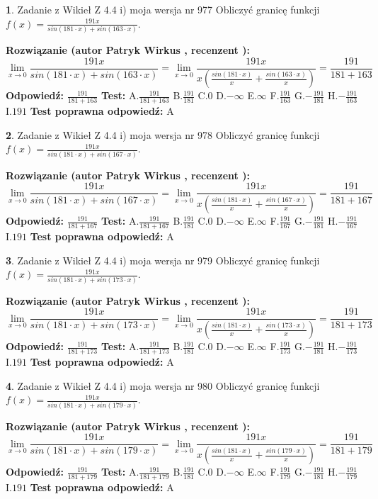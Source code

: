 \documentclass[12pt, a4paper]{article}
\theoremstyle{definition} %
\newtheorem{zad}{}
\newcommand{\zadStart}[1]{\begin{zad}#1\newline}
\newcommand{\zadStop}{\end{zad}}
\newcommand{\rozwStart}[2]{\noindent \textbf{Rozwiązanie (autor #1 , recenzent #2): }\newline}
\newcommand{\rozwStop}{\newline}
\newcommand{\odpStart}{\noindent \textbf{Odpowiedź:}\newline}
\newcommand{\odpStop}{\newline}
\newcommand{\testStart}{\noindent \textbf{Test:}\newline}
\newcommand{\testStop}{\newline}
\newcommand{\kluczStart}{\noindent \textbf{Test poprawna odpowiedź:}\newline}
\newcommand{\kluczStop}{\newline}
\begin{document}
\zadStart{Zadanie z Wikieł Z 4.4 i) moja wersja nr 977}
Obliczyć granicę funkcji $f(x)=\frac{191x}{sin(181\cdot x) +sin(163\cdot x)}$.
\zadStop
\rozwStart{Patryk Wirkus}{}
$$\lim\limits_{x\to 0}\frac{191x}{sin(181\cdot x) +sin(163\cdot x)}=\lim\limits_{x\to 0}\frac{191x}{x(\frac{sin(181\cdot x)}{x}+\frac{sin(163\cdot x)}{x})}=\frac{191}{181+163}$$
\rozwStop
\odpStart
$\frac{191}{181+163}$
\odpStop
\testStart
A.$\frac{191}{181+163}$
B.$\frac{191}{181}$
C.$0$
D.$-\infty$
E.$\infty$
F.$\frac{191}{163}$
G.$-\frac{191}{181}$
H.$-\frac{191}{163}$
I.$191$
\testStop
\kluczStart
A
\kluczStop



\zadStart{Zadanie z Wikieł Z 4.4 i) moja wersja nr 978}
Obliczyć granicę funkcji $f(x)=\frac{191x}{sin(181\cdot x) +sin(167\cdot x)}$.
\zadStop
\rozwStart{Patryk Wirkus}{}
$$\lim\limits_{x\to 0}\frac{191x}{sin(181\cdot x) +sin(167\cdot x)}=\lim\limits_{x\to 0}\frac{191x}{x(\frac{sin(181\cdot x)}{x}+\frac{sin(167\cdot x)}{x})}=\frac{191}{181+167}$$
\rozwStop
\odpStart
$\frac{191}{181+167}$
\odpStop
\testStart
A.$\frac{191}{181+167}$
B.$\frac{191}{181}$
C.$0$
D.$-\infty$
E.$\infty$
F.$\frac{191}{167}$
G.$-\frac{191}{181}$
H.$-\frac{191}{167}$
I.$191$
\testStop
\kluczStart
A
\kluczStop



\zadStart{Zadanie z Wikieł Z 4.4 i) moja wersja nr 979}
Obliczyć granicę funkcji $f(x)=\frac{191x}{sin(181\cdot x) +sin(173\cdot x)}$.
\zadStop
\rozwStart{Patryk Wirkus}{}
$$\lim\limits_{x\to 0}\frac{191x}{sin(181\cdot x) +sin(173\cdot x)}=\lim\limits_{x\to 0}\frac{191x}{x(\frac{sin(181\cdot x)}{x}+\frac{sin(173\cdot x)}{x})}=\frac{191}{181+173}$$
\rozwStop
\odpStart
$\frac{191}{181+173}$
\odpStop
\testStart
A.$\frac{191}{181+173}$
B.$\frac{191}{181}$
C.$0$
D.$-\infty$
E.$\infty$
F.$\frac{191}{173}$
G.$-\frac{191}{181}$
H.$-\frac{191}{173}$
I.$191$
\testStop
\kluczStart
A
\kluczStop



\zadStart{Zadanie z Wikieł Z 4.4 i) moja wersja nr 980}
Obliczyć granicę funkcji $f(x)=\frac{191x}{sin(181\cdot x) +sin(179\cdot x)}$.
\zadStop
\rozwStart{Patryk Wirkus}{}
$$\lim\limits_{x\to 0}\frac{191x}{sin(181\cdot x) +sin(179\cdot x)}=\lim\limits_{x\to 0}\frac{191x}{x(\frac{sin(181\cdot x)}{x}+\frac{sin(179\cdot x)}{x})}=\frac{191}{181+179}$$
\rozwStop
\odpStart
$\frac{191}{181+179}$
\odpStop
\testStart
A.$\frac{191}{181+179}$
B.$\frac{191}{181}$
C.$0$
D.$-\infty$
E.$\infty$
F.$\frac{191}{179}$
G.$-\frac{191}{181}$
H.$-\frac{191}{179}$
I.$191$
\testStop
\kluczStart
A
\kluczStop
\end{document}
